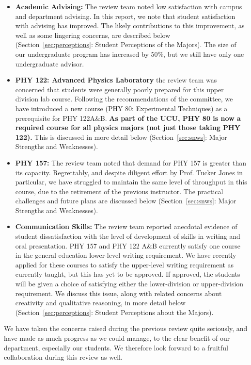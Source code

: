 \documentclass[12pt]{article}
\begin{document}
\begin{itemize}
 \item {\bf Academic Advising:} The review team noted low satisfaction
   with campus and department advising.  In this report, we note that
   student satisfaction with advising has improved.  The likely
   contributions to this improvement, as well as some lingering
   concerns, are described below (Section~\ref{sec:perceptions}:
   Student Perceptions of the Majors).  The size of our undergraduate
   program has increased by $50\%$, but we still have only one
   undergraduate advisor.

 \item {\bf PHY 122: Advanced Physics Laboratory} the review team was
   concerned that students were generally poorly prepared for this
   upper division lab course.  Following the recommendations of the
   committee, we have introduced a new course (PHY 80: Experimental
   Techniques) as a prerequisite for PHY 122A\&B.  {\bf As part of the
     UCU, PHY 80 is now a required course for all physics majors (not
     just those taking PHY 122).}  This is discussed in more detail
   below (Section~\ref{sec:snws}: Major Strengths and Weaknesses).
  
 \item {\bf PHY 157:} The review team noted that demand for PHY 157 is
   greater than its capacity.  Regrettably, and despite diligent
   effort by Prof. Tucker Jones in particular, we have struggled to
   maintain the same level of throughput in this course, due to the
   retirement of the previous instructor.  The practical challenges
   and future plans are discussed below (Section~\ref{sec:snws}:
   Major Strengths and Weaknesses).

 \item {\bf Communication Skills:} The review team reported anecdotal
   evidence of student dissatisfaction with the level of development
   of skills in writing and oral presentation.  PHY 157 and PHY 122
   A\&B currently satisfy one course in the general education
   lower-level writing requirement.  We have recently applied for these 
   courses to satisfy the upper-level writing requirement as currently
   taught, but this has yet to be approved.  If approved, the students
   will be given a choice of satisfying either the lower-division or 
   upper-division requirement.  We discuss this
   issue, along with related concerns about creativity and qualitative
   reasoning, in more detail below (Section~\ref{sec:perceptions}:
   Student Perceptions about the Majors).
\end{itemize}
We have taken the concerns raised during the previous review quite
seriously, and have made as much progress as we could manage, to the
clear benefit of our department, especially our students.  We
therefore look forward to a fruitful collaboration during this review
as well.
\end{document}
